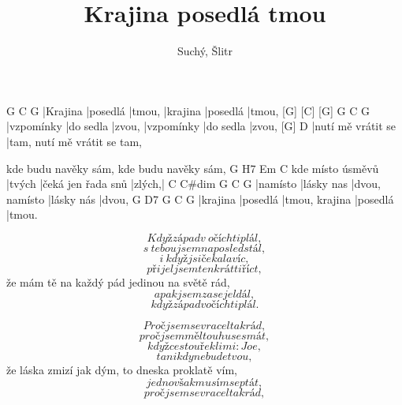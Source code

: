\documentclass{song}
\title{Krajina posedlá tmou}
\author{Suchý, Šlitr}
\begin{document}
\strophe
[G]      [C]      [G]    G        C        G
|Krajina |posedlá |tmou, |krajina |posedlá |tmou,
[G]        [C]       [G]    G          C         G
|vzpomínky |do sedla |zvou, |vzpomínky |do sedla |zvou,
[G]                D
|nutí mě vrátit se |tam, nutí mě vrátit se tam,

kde budu navěky sám, kde budu navěky sám,
                 G      H7                 Em     C
kde místo úsměvů |tvých |čeká jen řada snů |zlých,|
C        C#dim      G              C          G
|namísto |lásky nas |dvou, namísto |lásky nás |dvou,
G        D7       G              C        G
|krajina |posedlá |tmou, krajina |posedlá |tmou.
\endstrophe

\strophe*
\[ Když západ v~očích ti plál, \]
\[ s~tebou jsem naposled stál, \]
\[ i~když jsi čekala víc, \]
\[ přijel jsem tenkrát ti říct, \]
že mám tě na každý pád jedinou na světě rád,
\[ a pak jsem zase jel dál, \]
\[ když západ v očích ti plál. \]
\endstrophe

\strophe*
\[ Proč jsem se vracel tak rád, \]
\[ proč jsem měl touhu se smát, \]
\[ když cestou řekli mi: Joe, \]
\[ ta nikdy nebude tvou, \]
že láska zmizí jak dým, to dneska proklatě vím,
\[ jedno však musím se ptát, \]
\[ proč jsem se vracel tak rád, \]
\endstrophe
\end{document}
